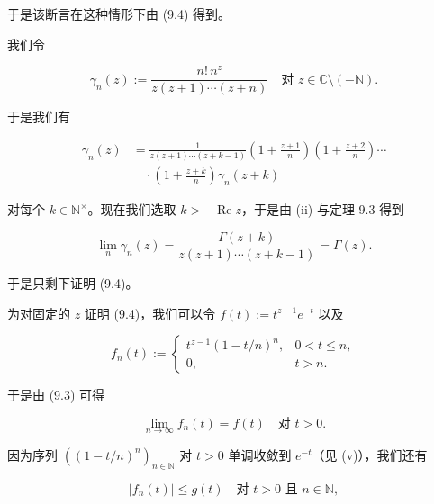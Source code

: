 \begin{theorem}
\begin{subitems}
于是该断言在这种情形下由 (9.4) 得到。

\item

我们令

\begin{equation}
\gamma_n(z) := \frac{n! \, n^{z}}{z(z+1) \cdots (z+n)} \quad \text{对 } z \in \mathbb{C}\setminus(-\mathbb{N}) .\tag{9.5}
\end{equation}

于是我们有

\begin{equation*}
\begin{aligned}
\gamma_n(z) &= \frac{1}{z(z+1) \cdots (z+k-1)} \left( 1 + \frac{z+1}{n} \right) \left( 1 + \frac{z+2}{n} \right) \cdots \\ &\quad \cdot \left( 1 + \frac{z+k}{n} \right) \gamma_n(z+k)
\end{aligned}
\end{equation*}

对每个 $ k \in \mathbb{N}^{\times} $。现在我们选取 $ k > -\operatorname{Re} z $，于是由 (ii) 与定理 9.3 得到

\[
\lim_{n} \gamma_n(z) = \frac{\Gamma(z+k)}{z(z+1) \cdots (z+k-1)} = \Gamma(z) .
\]

于是只剩下证明 (9.4)。

\item

为对固定的 $ z $ 证明 (9.4)，我们可以令 $ f(t) := t^{z-1} e^{-t} $ 以及

\begin{equation*}
f_n(t) := \begin{cases} t^{z-1} (1 - t/n)^{n} , & 0 < t \le n , \\ 0 , & t > n . \end{cases}
\end{equation*}

于是由 (9.3) 可得

\begin{equation}
\lim_{n \to \infty} f_n(t) = f(t) \quad \text{对 } t > 0 .\tag{9.6}
\end{equation}

因为序列 $ \left( (1 - t/n)^{n} \right)_{n \in \mathbb{N}} $ 对 $ t > 0 $ 单调收敛到 $ e^{-t} $（见 (v)），我们还有

\begin{equation}
\left| f_n(t) \right| \le g(t) \quad \text{对 } t > 0 \text{ 且 } n \in \mathbb{N} ,\tag{9.7}
\end{equation}


\end{subitems}
\end{theorem}
